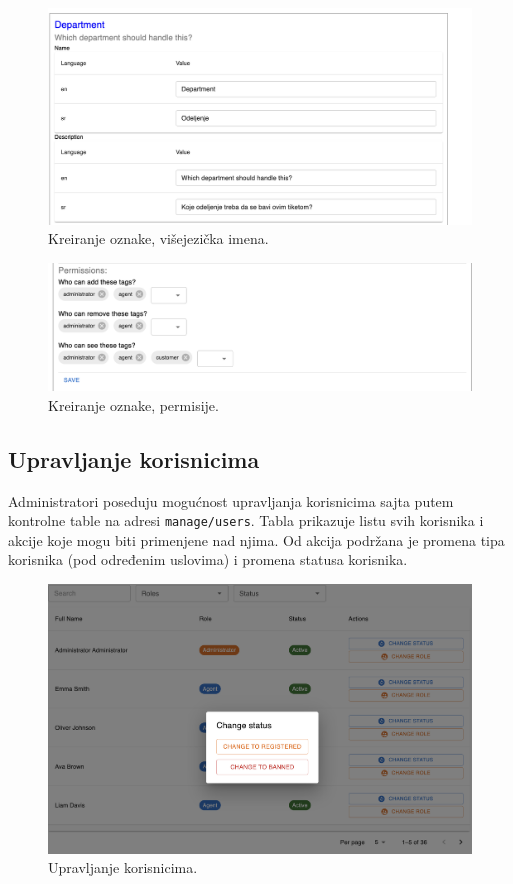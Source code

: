 \documentclass[12pt,oneside]{memoir}
\begin{document}
\begin{figure}[h]
  \centering
  \includegraphics[width=1\textwidth]{docs/images/ch_1/tag-mgmt-head.png} 
  \caption{Kreiranje oznake, višejezička imena.}
\end{figure}

\begin{figure}[h]
  \centering
  \includegraphics[width=1\textwidth]{docs/images/ch_1/tag-mgmt-permissions.png} 
  \caption{Kreiranje oznake, permisije.}
\end{figure}

\newpage
\subsection{Upravljanje korisnicima}

Administratori poseduju mogućnost upravljanja korisnicima sajta putem kontrolne table na adresi \verb|manage/users|. Tabla prikazuje listu svih korisnika i akcije koje mogu biti primenjene nad njima. Od akcija podržana je promena tipa korisnika (pod određenim uslovima) i promena statusa korisnika.

\begin{figure}[h]
  \centering
  \includegraphics[width=1\textwidth]{docs/images/ch_1/manage-users-preview.png} 
  \caption{Upravljanje korisnicima.}
\end{figure}
\end{document}
